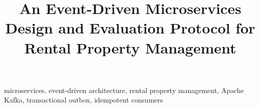 \documentclass[conference,a4paper,onecolumn]{IEEEtran}
\title{An Event-Driven Microservices Design and Evaluation Protocol for Rental Property Management}
\author{
\IEEEauthorblockN{Nguyen Ba Thai Duong}
\and
\IEEEauthorblockN{Bui Gia Huy}
\and
\IEEEauthorblockN{Vo Anh Duy}
\and
\IEEEauthorblockN{Pham Xuan Hoang}
\and
\IEEEauthorblockN{Duong Quang Long}
}
\begin{document}
\maketitle



\begin{IEEEkeywords}
microservices, event-driven architecture, rental property management,
Apache Kafka, transactional outbox, idempotent consumers
\end{IEEEkeywords}











\end{document}
